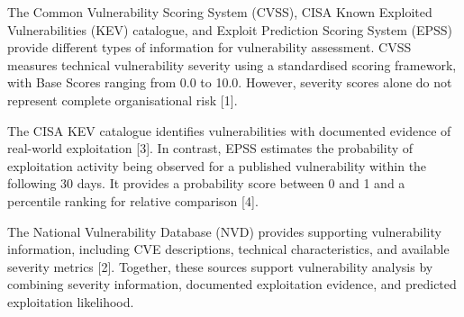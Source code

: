 \documentclass[
]{article}
\begin{document}
The Common Vulnerability Scoring System (CVSS), CISA Known Exploited
Vulnerabilities (KEV) catalogue, and Exploit Prediction Scoring System
(EPSS) provide different types of information for vulnerability
assessment. CVSS measures technical vulnerability severity using a
standardised scoring framework, with Base Scores ranging from 0.0 to
10.0. However, severity scores alone do not represent complete
organisational risk {[}1{]}.

The CISA KEV catalogue identifies vulnerabilities with documented
evidence of real-world exploitation {[}3{]}. In contrast, EPSS estimates
the probability of exploitation activity being observed for a published
vulnerability within the following 30 days. It provides a probability
score between 0 and 1 and a percentile ranking for relative comparison
{[}4{]}.

The National Vulnerability Database (NVD) provides supporting
vulnerability information, including CVE descriptions, technical
characteristics, and available severity metrics {[}2{]}. Together, these
sources support vulnerability analysis by combining severity
information, documented exploitation evidence, and predicted
exploitation likelihood.
\end{document}

